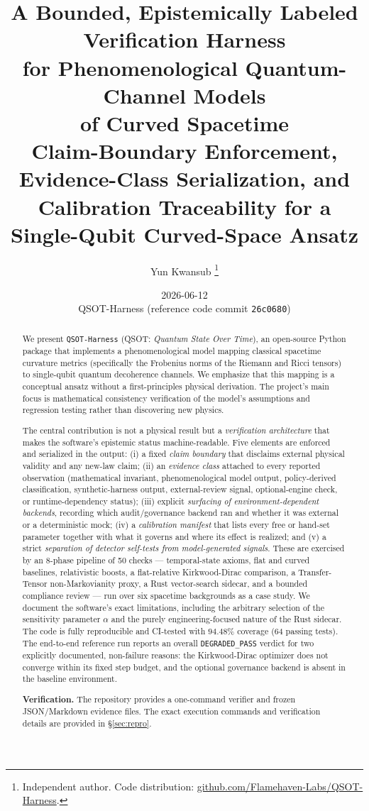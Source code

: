 \documentclass[11pt,a4paper]{article}
\title{%
  A Bounded, Epistemically Labeled Verification Harness\\
  for Phenomenological Quantum-Channel Models\\
  of Curved Spacetime\\[0.5em]
  \large Claim-Boundary Enforcement, Evidence-Class Serialization, and Calibration Traceability for a Single-Qubit Curved-Space Ansatz}
\author{%
  Yun Kwansub%
  \thanks{Independent author. Code distribution:
    \href{https://github.com/Flamehaven-Labs/QSOT-Harness}{github.com/Flamehaven-Labs/QSOT-Harness}.}%
}
\date{2026-06-12 \\ \small QSOT-Harness (reference code commit \texttt{26c0680})}
\theoremstyle{reproduction}
\begin{document}
\maketitle

\begin{abstract}
We present \texttt{QSOT-Harness} (QSOT: \emph{Quantum State Over Time}), an open-source Python package that implements a phenomenological model mapping classical spacetime curvature metrics (specifically the Frobenius norms of the Riemann and Ricci tensors) to single-qubit quantum decoherence channels. We emphasize that this mapping is a conceptual ansatz without a first-principles physical derivation. The project's main focus is mathematical consistency verification of the model's assumptions and regression testing rather than discovering new physics. 

The central contribution is not a physical result but a \emph{verification architecture} that makes the software's epistemic status machine-readable. Five elements are enforced and serialized in the output: (i) a fixed \emph{claim boundary} that disclaims external physical validity and any new-law claim; (ii) an \emph{evidence class} attached to every reported observation (mathematical invariant, phenomenological model output, policy-derived classification, synthetic-harness output, external-review signal, optional-engine check, or runtime-dependency status); (iii) explicit \emph{surfacing of environment-dependent backends}, recording which audit/governance backend ran and whether it was external or a deterministic mock; (iv) a \emph{calibration manifest} that lists every free or hand-set parameter together with what it governs and where its effect is realized; and (v) a strict \emph{separation of detector self-tests from model-generated signals}. These are exercised by an 8-phase pipeline of 50 checks --- temporal-state axioms, flat and curved baselines, relativistic boosts, a flat-relative Kirkwood-Dirac comparison, a Transfer-Tensor non-Markovianity proxy, a Rust vector-search sidecar, and a bounded compliance review --- run over six spacetime backgrounds as a case study. We document the software's exact limitations, including the arbitrary selection of the sensitivity parameter $\alpha$ and the purely engineering-focused nature of the Rust sidecar. The code is fully reproducible and CI-tested with $94.48\%$ coverage (64 passing tests). The end-to-end reference run reports an overall \texttt{DEGRADED\_PASS} verdict for two explicitly documented, non-failure reasons: the Kirkwood-Dirac optimizer does not converge within its fixed step budget, and the optional governance backend is absent in the baseline environment.

\noindent\textbf{Verification.}
The repository provides a one-command verifier and frozen JSON/Markdown evidence files. The exact execution commands and verification details are provided in \S\ref{sec:repro}.
\end{abstract}
\end{document}

